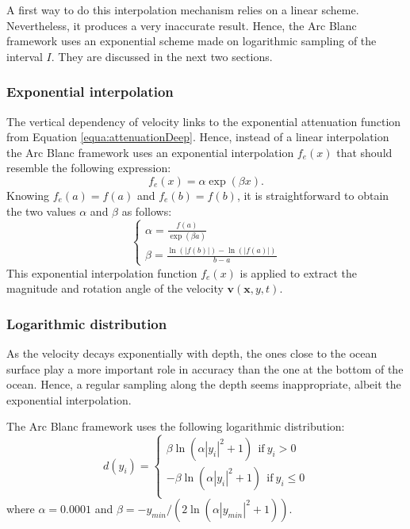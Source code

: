 \documentclass[final]{jcgt}
\def\Framework{The Arc Blanc framework\xspace}
\def\framework{the Arc Blanc framework\xspace}
\begin{document}
A first way to do this interpolation mechanism relies on a linear scheme.
Nevertheless, it produces a very inaccurate result.
Hence, \framework uses an exponential scheme made on logarithmic sampling of the interval $I$.
They are discussed in the next two sections.

\subsubsection{Exponential interpolation}
The vertical dependency of velocity links to the exponential attenuation function from Equation \ref{equa:attenuationDeep}.
Hence, instead of a linear interpolation \framework uses an exponential interpolation $f_e(x)$ that should resemble the following expression:
\begin{equation}
	f_e(x)=\alpha \exp(\beta x).
\end{equation}
Knowing $f_e(a)=f(a)$ and $f_e(b)=f(b)$, it is straightforward to obtain the two values $\alpha$ and $\beta$ as follows:
\begin{equation}
	\begin{cases}
		\displaystyle\alpha = \frac{f(a)}{\exp(\beta a)} \\
		\displaystyle\beta = \frac{\ln(|f(b)|) - \ln(|f(a)|)}{b - a}
	\end{cases}
\end{equation}
This exponential interpolation function $f_e(x)$ is applied to extract the magnitude and rotation angle of the velocity $\mathbf v(\mathbf x,y,t)$.

\subsubsection{Logarithmic distribution}
As the velocity decays exponentially with depth, the ones close to the ocean surface play a more important role in accuracy than the one at the bottom of the ocean.
Hence, a regular sampling along the depth seems inappropriate, albeit the exponential interpolation.

\Framework uses the following logarithmic distribution:
\begin{equation}
	d(y_i) =
	\begin{cases}
		\beta \ln(\alpha|y_i|^2+1) ~~\text{if}~y_i>0     \\
		-\beta \ln(\alpha|y_i|^2+1) ~~\text{if}~y_i\leq0 \\
	\end{cases}
\end{equation}
where $\alpha=0.0001$ and $\beta = -y_{min}/\left(2 \ln(\alpha |y_{min}|^2 + 1)\right)$.
\end{document}
